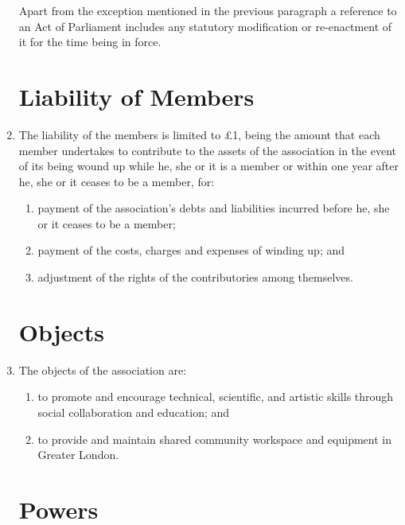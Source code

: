 \begin{enumerate}
  Apart from the exception mentioned in the previous paragraph a
  reference to an Act of Parliament includes any statutory
  modification or re-enactment of it for the time being in force.

\section{Liability of Members}

\item
  The liability of the members is limited to £1, being the amount that
  each member undertakes to contribute to the assets of the association
  in the event of its being wound up while he, she or it is a member or
  within one year after he, she or it ceases to be a member, for:
  \begin{enumerate}
  \item
    payment of the association's debts and liabilities incurred before he,
    she or it ceases to be a member;
  \item
    payment of the costs, charges and expenses of winding up; and
  \item
    adjustment of the rights of the contributories among themselves.
  \end{enumerate}

\section{Objects}

\item
  The objects of the association are:
  \begin{enumerate}
  \item
    to promote and encourage technical, scientific, and artistic skills through social collaboration and education; and
  \item
    to provide and maintain shared community workspace and equipment in Greater London.
  \end{enumerate}

\section{Powers}


\end{enumerate}
